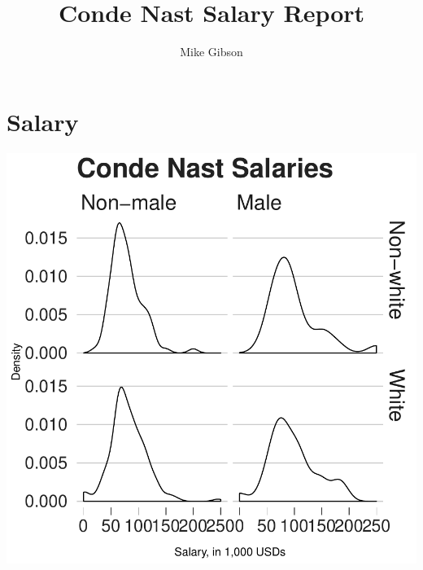 \documentclass[12pt]{article}         %
\title{Conde Nast Salary Report}  %
\author{Mike Gibson}          %
\begin{document}





\maketitle              %

\tableofcontents        %



\bigskip   %

\section{Salary}


\includegraphics{report-002}
\end{document}
